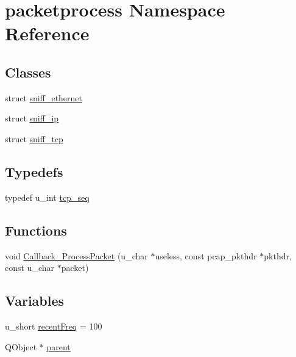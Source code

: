 \hypertarget{namespacepacketprocess}{\section{packetprocess Namespace Reference}
\label{namespacepacketprocess}
}
\subsection*{Classes}
\begin{DoxyCompactItemize}
\item 
struct \hyperlink{structpacketprocess_1_1sniff__ethernet}{sniff\-\_\-ethernet}
\item 
struct \hyperlink{structpacketprocess_1_1sniff__ip}{sniff\-\_\-ip}
\item 
struct \hyperlink{structpacketprocess_1_1sniff__tcp}{sniff\-\_\-tcp}
\end{DoxyCompactItemize}
\subsection*{Typedefs}
\begin{DoxyCompactItemize}
\item 
typedef u\-\_\-int \hyperlink{namespacepacketprocess_a18e81a7f74513cbc9f8881ee72f67abe}{tcp\-\_\-seq}
\end{DoxyCompactItemize}
\subsection*{Functions}
\begin{DoxyCompactItemize}
\item 
void \hyperlink{namespacepacketprocess_a17240af943c2d732bb5242e802445a5f}{Callback\-\_\-\-Process\-Packet} (u\-\_\-char $\ast$useless, const pcap\-\_\-pkthdr $\ast$pkthdr, const u\-\_\-char $\ast$packet)
\end{DoxyCompactItemize}
\subsection*{Variables}
\begin{DoxyCompactItemize}
\item 
u\-\_\-short \hyperlink{namespacepacketprocess_a0ffda1e178a79656e927189b103e8708}{recent\-Freq} = 100
\item 
Q\-Object $\ast$ \hyperlink{namespacepacketprocess_ad98eea621960299d54ed1535bf3a605e}{parent}
\end{DoxyCompactItemize}


